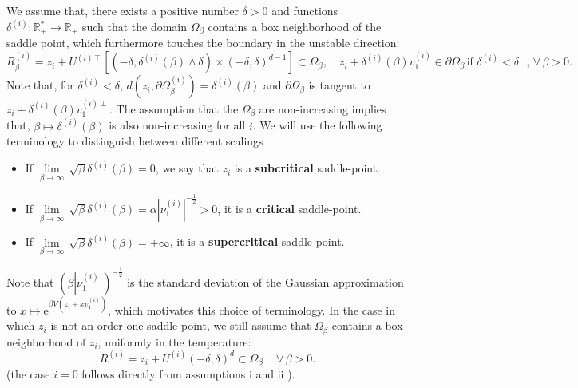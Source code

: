\documentclass[10pt]{article}
\newcommand{\e}{\mathrm{e}}
\newcommand{\R}{\mathbb{R}}
\newcommand{\1}{\mathbbm 1}
\newcommand{\deltai }{\delta^{(i)}}
\begin{document}
    We assume that, there exists a positive number $\delta>0$ and functions~$\deltai :\R_+^*\to\R_+$ such that the domain $\Omega_\beta$ contains a box neighborhood of the saddle point, which furthermore touches the boundary in the unstable direction:
    \begin{equation}
        \label{eq:box_neighborhoods_saddles}
        R_\beta^{(i)} = z_i + U^{(i)\intercal}\left[(-\delta,\deltai (\beta)\land\delta)\times(-\delta,\delta)^{d-1}\right] \subset \Omega_\beta,\quad z_i +\deltai (\beta)v_1^{(i)} \in \partial\Omega_\beta\,\text{if $\deltai  < \delta$ },\,\forall\, \beta >0.
    \end{equation}
    Note that, for $\deltai <\delta$, $d(z_i,\partial\Omega_\beta^{(i)}) = \deltai (\beta)$ and $\partial\Omega_\beta$ is tangent to $z_i + \deltai (\beta)v_1^{(i)\perp}$. 
    The assumption that the $\Omega_\beta$ are non-increasing implies that, $\beta \mapsto \delta^{(i)}(\beta)$ is also non-increasing for all $i$.
    We will use the following terminology to distinguish between different scalings 
    \begin{itemize}
        \item If $\underset{\beta\to\infty}{\lim}\,\sqrt{\beta}\deltai(\beta)  = 0$, we say that $z_i$ is a {\bf subcritical} saddle-point.
        \item If $\underset{\beta\to\infty}{\lim}\,\sqrt{\beta}\deltai(\beta)  = \alpha\left|\nu_1^{(i)}\right|^{-\frac12} >0$, it is a {\bf critical} saddle-point.
        \item If $\underset{\beta\to\infty}{\lim}\,\sqrt{\beta}\deltai(\beta)  = +\infty$, it is a {\bf supercritical} saddle-point.
    \end{itemize}
    Note that $\left({\beta\left|\nu_1^{(i)}\right|}\right)^{-\frac12}$ is the standard deviation of the Gaussian approximation to $x \mapsto \e^{\beta V(z_i + x v_1^{(i)})}$, which motivates this choice of terminology.
    In the case in which $z_i$ is not an order-one saddle point, we still assume that $\Omega_\beta$ contains a box neighborhood of $z_i$, uniformly in the temperature:
    \begin{equation}
        \label{eq:box_neighborhoods_extrema} %
         R^{(i)} = z_i + U^{(i)}(-\delta,\delta)^d \subset \Omega_\beta\,\quad \forall\,\beta>0.
    \end{equation}
    (the case $i=0$ follows directly from assumptions i and ii ).
\end{document}
